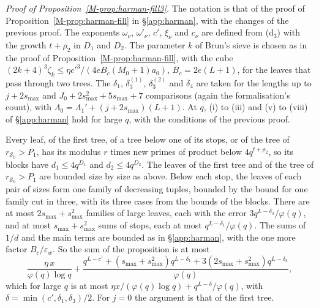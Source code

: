 \documentclass[11pt]{article}
\numberwithin{equation}{section}
\begin{document}
\emph{Proof of Proposition~\ref{M-prop:harman-fill3}.} The notation is that of the proof of
Proposition~\ref{M-prop:harman-fill} in \S\ref{app:harman}, with the changes of the previous proof. The exponents
$\omega_\nu$, $\omega'_\nu$, $c'$, $\xi_\nu$ and $c_\nu$ are defined from (d$_3$) with the growth $t + \rho_2$ in $D_1$
and $D_2$. The parameter $k$ of Brun's sieve is chosen as in the proof of Proposition~\ref{M-prop:harman-fill}, with the
cube $(2k + 4)^3 \zeta_k \le \eta c'^3/(4eB_c(M_0 + 1)a_0)$, $B_c = 2e(L + 1)$, for the leaves that pass through two
trees. The $\delta_1$, $\delta_3^{(1)}$, $\delta_3^{(2)}$ and $\delta_4$ are taken for the lengths up to $j + 2s_{\max}$
and $J_0 + 2s_{\max}^2 + 5s_{\max} + 7$ comparisons (again the formalisation's count), with $\Lambda_0 = \Lambda_1' + (j
+ 2s_{\max})(L + 1)$. At $q$, (i) to (iii) and (v) to (viii) of \S\ref{app:harman} hold for large $q$, with the
conditions of the previous proof.

Every leaf, of the first tree, of a tree below one of its stops, or of the tree of
$r_{\mathcal S_0} > P_1$, has its modulus $r$ times new primes of product below $4q^{t + \rho_2}$, so its blocks have
$d_1 \le 4q^{D_1}$ and $d_2 \le 4q^{D_2}$. The leaves of the first tree and of the tree of $r_{\mathcal S_0} > P_1$ are
bounded size by size as above. Below each stop, the leaves of each pair of sizes form one family of decreasing tuples,
bounded by the bound for one family cut in three, with its three cases from the bounds of the blocks. There are at most
$2s_{\max} + s_{\max}^2$ families of large leaves, each with the error $3q^{L - \delta_3}/\varphi(q)$, and at most
$s_{\max} + s_{\max}^2$ sums of stops, each at most $q^{L - \delta_1}/\varphi(q)$. The sums of $1/d$ and the main
terms are bounded as in \S\ref{app:harman}, with the one more factor $B_c/\varepsilon_w$. So the sum of the proposition
is at most
\[
  \frac{\eta \, x}{\varphi(q) \log q} + \frac{q^{L - c'} + (s_{\max} + s_{\max}^2) q^{L - \delta_1} + 3(2s_{\max} +
  s_{\max}^2) q^{L - \delta_3}}{\varphi(q)},
\]
which for large $q$ is at most $\eta x/(\varphi(q) \log q) + q^{L - \delta}/\varphi(q)$, with $\delta = \min(c',
\delta_1, \delta_3)/2$. For $j = 0$ the argument is that of the first tree.
\end{document}
